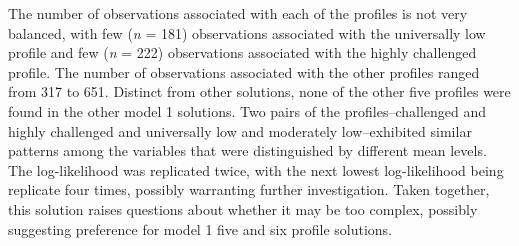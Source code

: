 \documentclass[]{book}
\theoremstyle{definition}
\theoremstyle{definition}
\theoremstyle{definition}
\theoremstyle{remark}
\begin{document}
The number of observations associated with each of the profiles is not
very balanced, with few (\emph{n} = 181) observations associated with
the universally low profile and few (\emph{n} = 222) observations
associated with the highly challenged profile. The number of
observations associated with the other profiles ranged from 317 to 651.
Distinct from other solutions, none of the other five profiles were
found in the other model 1 solutions. Two pairs of the
profiles--challenged and highly challenged and universally low and
moderately low--exhibited similar patterns among the variables that were
distinguished by different mean levels. The log-likelihood was
replicated twice, with the next lowest log-likelihood being replicate
four times, possibly warranting further investigation. Taken together,
this solution raises questions about whether it may be too complex,
possibly suggesting preference for model 1 five and six profile
solutions.


\end{document}
